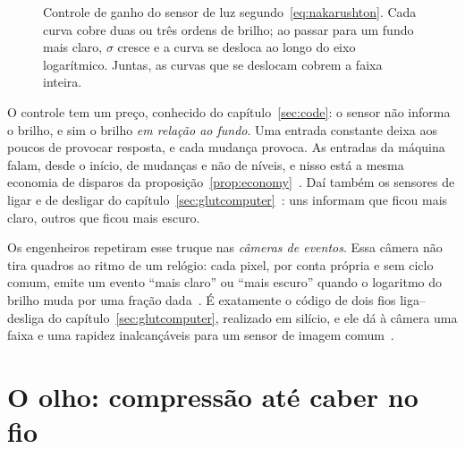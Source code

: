 \begin{figure}[t]
\centering
{}
\caption{Controle de ganho do sensor de luz segundo~\eqref{eq:nakarushton}. Cada curva cobre duas ou três ordens de brilho; ao passar para um fundo mais claro, $\sigma$ cresce e a curva se desloca ao longo do eixo logarítmico. Juntas, as curvas que se deslocam cobrem a faixa inteira.}
\label{fig:adaptation}
\end{figure}

O controle tem um preço, conhecido do capítulo~\ref{sec:code}: o sensor não informa o brilho, e sim o brilho \emph{em relação ao fundo}. Uma entrada constante deixa aos poucos de provocar resposta, e cada mudança provoca. As entradas da máquina falam, desde o início, de mudanças e não de níveis, e nisso está a mesma economia de disparos da proposição~\ref{prop:economy}~\cite{Barlow1961}. Daí também os sensores de ligar e de desligar do capítulo~\ref{sec:glutcomputer}~\cite{Schiller1992}: uns informam que ficou mais claro, outros que ficou mais escuro.

Os engenheiros repetiram esse truque nas \emph{câmeras de eventos}. Essa câmera não tira quadros ao ritmo de um relógio: cada pixel, por conta própria e sem ciclo comum, emite um evento ``mais claro'' ou ``mais escuro'' quando o logaritmo do brilho muda por uma fração dada~\cite{Lichtsteiner2008}. É exatamente o código de dois fios liga--desliga do capítulo~\ref{sec:glutcomputer}, realizado em silício, e ele dá à câmera uma faixa e uma rapidez inalcançáveis para um sensor de imagem comum~\cite{Gallego2022}.

\section{O olho: compressão até caber no fio}

